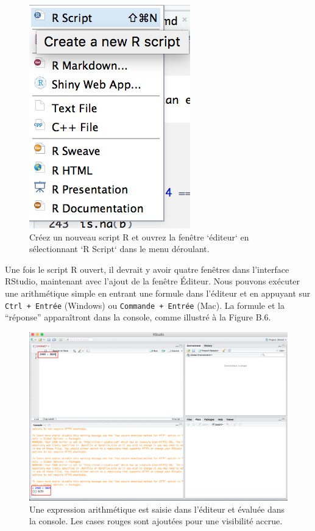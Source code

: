 \documentclass[
  12pt,
]{book}
\begin{document}
\begin{figure}
\includegraphics[width=0.6\linewidth]{Images/new_script} \caption{Créez un nouveau script R et ouvrez la fenêtre `éditeur` en sélectionnant `R Script` dans le menu déroulant.}\label{fig:newscript}
\end{figure}

Une fois le script R ouvert, il devrait y avoir quatre fenêtres dans l'interface RStudio, maintenant avec l'ajout de la fenêtre Éditeur. Nous pouvons exécuter une arithmétique simple en entrant une formule dans l'éditeur et en appuyant sur \texttt{Ctrl\ +\ Entrée} (Windows) ou \texttt{Commande\ +\ Entrée} (Mac). La formule et la ``réponse'' apparaîtront dans la console, comme illustré à la Figure B.6.

\begin{figure}
\includegraphics[width=0.6\linewidth]{Images/first_addition} \caption{Une expression arithmétique est saisie dans l'éditeur et évaluée dans la console. Les cases rouges sont ajoutées pour une visibilité accrue.}\label{fig:firstaddition}
\end{figure}
\end{document}
